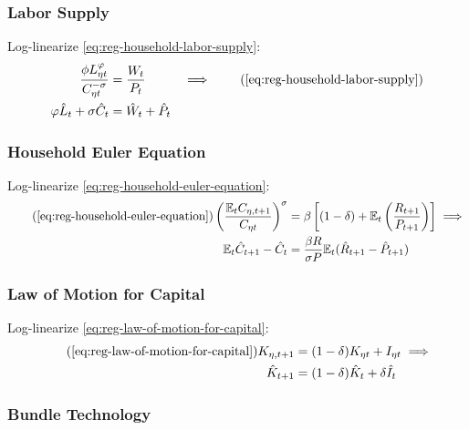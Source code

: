 \documentclass[
	thesis.tex
	]{subfiles}
\begin{document}

\subsubsection{Labor Supply}

Log-linearize \ref{eq:reg-household-labor-supply}:
\begin{alignat}{2}
	\frac{\phi L_{\eta t}^{\varphi}}{C_{\eta t}^{-\sigma}} &= \frac{W_t}{P_t} & \implies \tag{\ref{eq:reg-household-labor-supply}} \\
	\varphi \hat{L}_t + \sigma \hat{C}_t &= \hat{W}_t + \hat{P}_t & \label{eq:reg-ll-labor-supply}
\end{alignat}


\subsubsection{Household Euler Equation}

Log-linearize \ref{eq:reg-household-euler-equation}:
\begin{align}
	\tag{\ref{eq:reg-household-euler-equation}}
	\left( \frac{\mathbb{E}_t C_{\eta, t+1}}{C_{\eta t}} \right)^\sigma &= \beta \left[ (1-\delta) + \mathbb{E}_t \left(\frac{R_{t+1}}{P_{t+1}}\right) \right] \implies \\
	\label{eq:reg-ll-household-euler-equation}
	\E \hat{C}_{t+1} - \hat{C}_t &= \frac{\beta R}{\sigma P} \E(\hat{R}_{t+1} - \hat{P}_{t+1})
\end{align}


\subsubsection{Law of Motion for Capital}

Log-linearize \ref{eq:reg-law-of-motion-for-capital}:
\begin{align}
	\tag{\ref{eq:reg-law-of-motion-for-capital}}
	K_{\eta, t+1} &= (1-\delta)K_{\eta t} + I_{\eta t} \implies \\
	\label{eq:reg-ll-law-of-motion-for-capital}
	\hat{K}_{t+1} &= (1-\delta)\hat{K}_t + \delta \hat{I}_t
\end{align}


\subsubsection{Bundle Technology}
\end{document}

